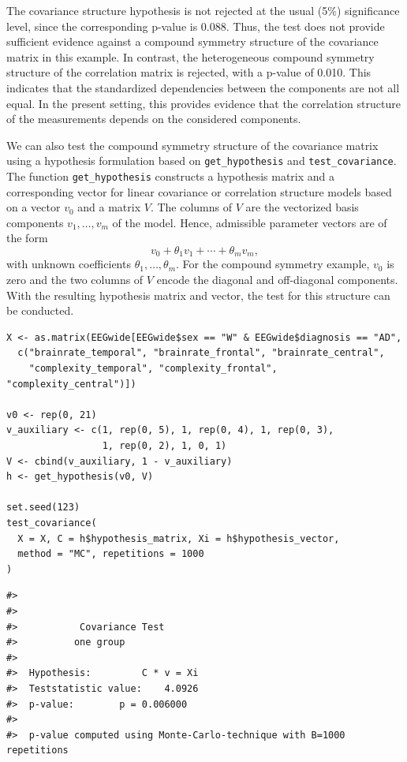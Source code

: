 The covariance structure hypothesis is not rejected at the usual (5\%)
significance level, since the corresponding p-value is 0.088. Thus, the test
does not provide sufficient evidence against a compound symmetry structure of
the covariance matrix in this example. In contrast, the heterogeneous compound
symmetry structure of the correlation matrix is rejected, with a p-value of
0.010. This indicates that the standardized dependencies between the components
are not all equal. In the present setting, this provides evidence that the correlation structure
of the measurements depends on the considered components.

We can also test the compound symmetry structure of the covariance matrix using a hypothesis formulation based on \texttt{get\_hypothesis} and \texttt{test\_covariance}. The function \texttt{get\_hypothesis} constructs a hypothesis matrix and a corresponding vector for linear covariance or correlation structure models based on a vector \(v_0\) and a matrix \(V\). The columns of \(V\) are the vectorized basis components \(v_1,\ldots,v_m\) of the model. Hence, admissible parameter vectors are of the form
\begin{equation}
v_0 + \theta_1 v_1 + \cdots + \theta_m v_m,
\label{eq:linear-structure-model}
\end{equation}
with unknown coefficients \(\theta_1,\ldots,\theta_m\). For the compound symmetry example, \(v_0\) is zero and the two columns of \(V\) encode the diagonal and off-diagonal components. With the resulting hypothesis matrix and vector, the test for this structure can be conducted.

\begin{verbatim}
X <- as.matrix(EEGwide[EEGwide$sex == "W" & EEGwide$diagnosis == "AD",
  c("brainrate_temporal", "brainrate_frontal", "brainrate_central",
    "complexity_temporal", "complexity_frontal", "complexity_central")])

v0 <- rep(0, 21)
v_auxiliary <- c(1, rep(0, 5), 1, rep(0, 4), 1, rep(0, 3),
                 1, rep(0, 2), 1, 0, 1)
V <- cbind(v_auxiliary, 1 - v_auxiliary)
h <- get_hypothesis(v0, V)

set.seed(123)
test_covariance(
  X = X, C = h$hypothesis_matrix, Xi = h$hypothesis_vector,
  method = "MC", repetitions = 1000
)
\end{verbatim}

\begin{verbatim}
#> 
#> 
#>           Covariance Test 
#>          one group
#> 
#>  Hypothesis:         C * v = Xi
#>  Teststatistic value:    4.0926
#>  p-value:        p = 0.006000
#>  
#>  p-value computed using Monte-Carlo-technique with B=1000 repetitions
\end{verbatim}

